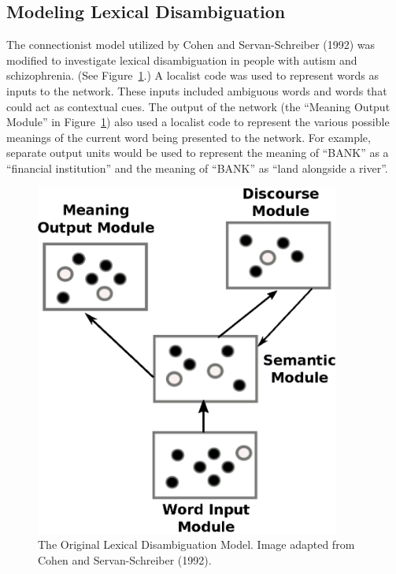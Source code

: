 \subsection{Modeling Lexical Disambiguation}
The connectionist model utilized by Cohen and Servan-Schreiber (1992) was modified to investigate lexical disambiguation in people with autism and schizophrenia. (See Figure~\ref{cohen-servan-schreiber-model}.)  A localist code was used to represent words as inputs to the network. These inputs included ambiguous words and words that could act as contextual cues. The output of the network (the ``Meaning Output Module'' in Figure~\ref{cohen-servan-schreiber-model}) also used a localist code to represent the various possible meanings of the current word being presented to the network. For example, separate output units would be used to represent the meaning of ``BANK'' as a ``financial institution'' and the meaning of ``BANK'' as ``land alongside a river''.

\begin{figure}[tp]
\begin{center}
	\includegraphics[width=100mm]{figures/Cohen_ServanSchreiber_Model.eps}
\end{center}
\caption{The Original Lexical Disambiguation Model. Image adapted from Cohen and Servan-Schreiber (1992).}
\label{cohen-servan-schreiber-model}
\end{figure} 


